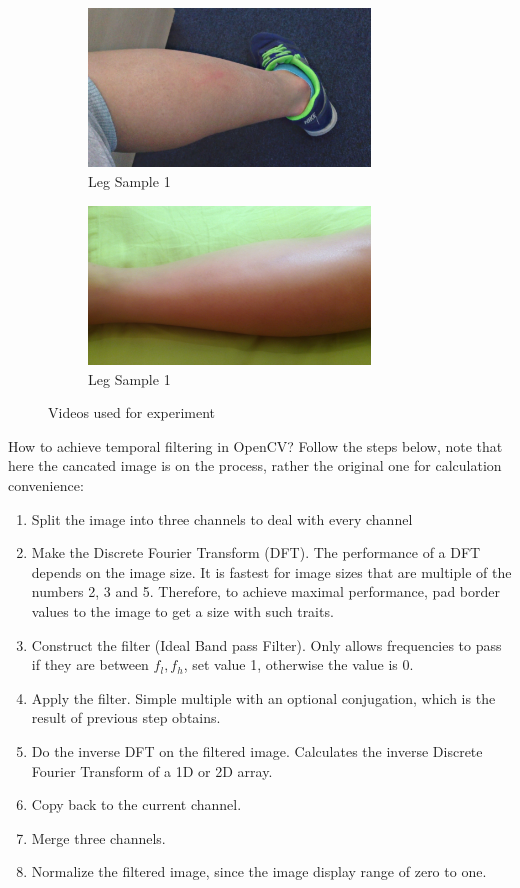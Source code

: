 \begin{figure}[!h]
\begin{subfigure}{.5\textwidth}
  \label{fig:sub2}
\end{subfigure}
\begin{subfigure}{.5\textwidth}
  \centering
  \includegraphics[width=7.5cm]{img/eulerian/test/leg}
  \caption{Leg Sample 1}
  \label{fig:sub1}
\end{subfigure}%
\begin{subfigure}{.5\textwidth}
  \centering
  \includegraphics[width=7.5cm]{img/eulerian/test/leg2}
  \caption{Leg Sample 1}
  \label{fig:sub2}
\end{subfigure}
\caption{Videos used for experiment}
\label{fig:test}
\end{figure}
How to achieve temporal filtering in OpenCV? Follow the steps below, note that here the cancated image is on the process, rather the original one for calculation convenience:
\begin{enumerate}
    \item Split the image into three channels to deal with every channel
    \item Make the Discrete Fourier Transform (DFT). The performance of a DFT depends on the image size. It is fastest for image sizes that are multiple of the numbers 2, 3 and 5. Therefore, to achieve maximal performance, pad border values to the image to get a size with such traits.
    \item Construct the filter (Ideal Band pass Filter). Only allows frequencies to pass if they are between $f_{l},f{_h}$, set value 1, otherwise the value is 0.
    \item Apply the filter. Simple multiple with an optional conjugation, which is the result of previous step obtains.
    \item Do the inverse DFT on the filtered image. Calculates the inverse Discrete Fourier Transform of a 1D or 2D array.
    \item Copy back to the current channel.
    \item Merge three channels.
    \item Normalize the filtered image, since the image display range of zero to one.
\end{enumerate}

